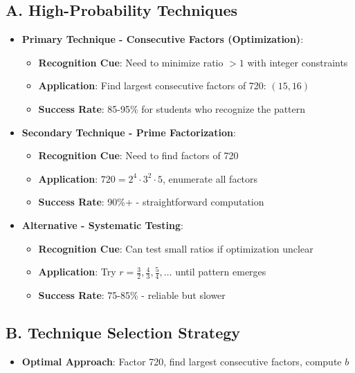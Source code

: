 \documentclass[11pt]{article}
\begin{document}
\begin{techniquesbox}
\subsection*{A. High-Probability Techniques}
\begin{itemize}[leftmargin=*]
    \item \textbf{Primary Technique - Consecutive Factors (Optimization)}: 
    \begin{itemize}
        \item \textbf{Recognition Cue}: Need to minimize ratio $> 1$ with integer constraints
        \item \textbf{Application}: Find largest consecutive factors of 720: $(15, 16)$
        \item \textbf{Success Rate}: 85-95\% for students who recognize the pattern
    \end{itemize}
    
    \item \textbf{Secondary Technique - Prime Factorization}: 
    \begin{itemize}
        \item \textbf{Recognition Cue}: Need to find factors of 720
        \item \textbf{Application}: $720 = 2^4 \cdot 3^2 \cdot 5$, enumerate all factors
        \item \textbf{Success Rate}: 90\%+ - straightforward computation
    \end{itemize}
    
    \item \textbf{Alternative - Systematic Testing}: 
    \begin{itemize}
        \item \textbf{Recognition Cue}: Can test small ratios if optimization unclear
        \item \textbf{Application}: Try $r = \frac{3}{2}, \frac{4}{3}, \frac{5}{4}, \ldots$ until pattern emerges
        \item \textbf{Success Rate}: 75-85\% - reliable but slower
    \end{itemize}
\end{itemize}

\subsection*{B. Technique Selection Strategy}
\begin{itemize}[leftmargin=*]
    \item \textbf{Optimal Approach}: Factor 720, find largest consecutive factors, compute $b$
    

\end{itemize}
\end{techniquesbox}
\end{document}

